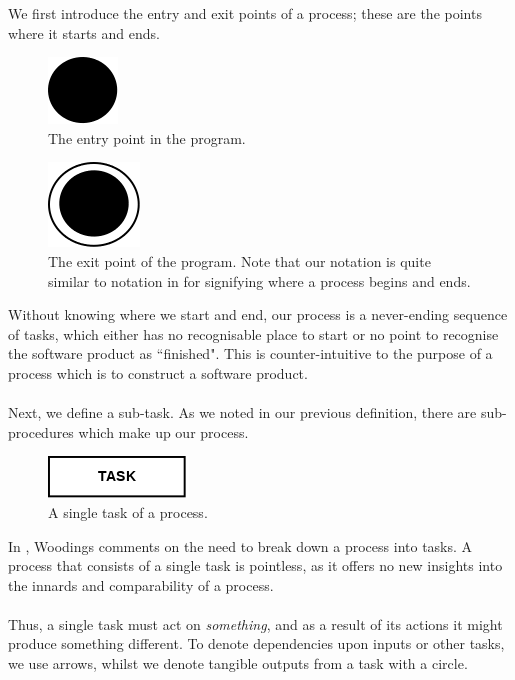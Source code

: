 We first introduce the entry and exit points of a process; these are the points where it starts and
ends.

\begin{figure}[ht!]
\centering
\includegraphics[scale=0.6]{media/Entry}
\caption{The entry point in the program.}
\label{entryFigure}
\end{figure}

\begin{figure}[ht!]
\centering
\includegraphics[scale=0.6]{media/Exit}
\caption{The exit point of the program. Note that our notation is quite similar to notation in \cite{Dumas01umlactivity} for
  signifying where a process begins and ends.}
\label{exitFigure}
\end{figure}

Without knowing where we start and end, our process is a never-ending sequence of tasks, which
either has no recognisable place to start or no point to recognise the software product as
``finished".
This is counter-intuitive to the purpose of a process which is to construct a software product.\\
\\
Next, we define a sub-task.
As we noted in our previous definition, there are sub-procedures which make up our process.

\begin{figure}[ht!]
\centering
\includegraphics[scale=0.6]{media/Task}
\caption{A single task of a process.}
\label{taskFigure}
\end{figure}

In \cite{Woodings2013Tut1}, Woodings comments on the need to break down a
process into tasks.
A process that consists of a single task is pointless, as it offers no new
insights into the innards and comparability of a process.\\
\\
Thus, a single task must act on {\em something}, and as a result of its actions
it might produce something different.
To denote dependencies upon inputs or other tasks, we use arrows, whilst we denote tangible outputs
from a task with a circle.

